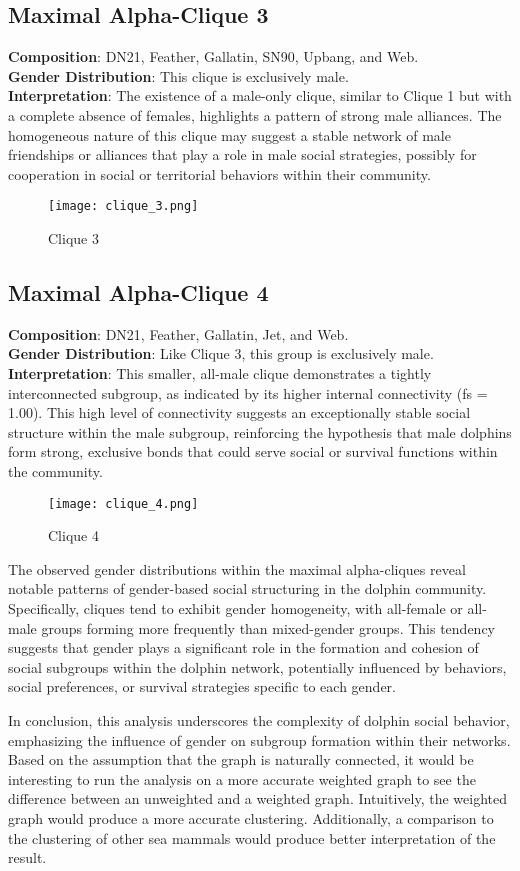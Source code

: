 \subsection{Maximal Alpha-Clique 3}
\textbf{Composition}: DN21, Feather, Gallatin, SN90, Upbang, and Web. \\
\textbf{Gender Distribution}: This clique is exclusively male. \\
\textbf{Interpretation}: The existence of a male-only clique, similar to Clique 1 but with a complete absence of females, highlights a pattern of strong male alliances. The homogeneous nature of this clique may suggest a stable network of male friendships or alliances that play a role in male social strategies, possibly for cooperation in social or territorial behaviors within their community.
\begin{figure}[H]
    \centering
    \texttt{[image: clique\_3.png]}
    \caption{Clique 3}
    \label{fig:clique_3}
\end{figure}

\subsection{Maximal Alpha-Clique 4}
\textbf{Composition}: DN21, Feather, Gallatin, Jet, and Web. \\
\textbf{Gender Distribution}: Like Clique 3, this group is exclusively male. \\
\textbf{Interpretation}: This smaller, all-male clique demonstrates a tightly interconnected subgroup, as indicated by its higher internal connectivity (fs = 1.00). This high level of connectivity suggests an exceptionally stable social structure within the male subgroup, reinforcing the hypothesis that male dolphins form strong, exclusive bonds that could serve social or survival functions within the community.
\begin{figure}[H]
    \centering
    \texttt{[image: clique\_4.png]}
    \caption{Clique 4}
    \label{fig:clique_4}
\end{figure}

The observed gender distributions within the maximal alpha-cliques reveal notable patterns of gender-based social structuring in the dolphin community. Specifically, cliques tend to exhibit gender homogeneity, with all-female or all-male groups forming more frequently than mixed-gender groups. This tendency suggests that gender plays a significant role in the formation and cohesion of social subgroups within the dolphin network, potentially influenced by behaviors, social preferences, or survival strategies specific to each gender.

In conclusion, this analysis underscores the complexity of dolphin social behavior, emphasizing the influence of gender on subgroup formation within their networks. Based on the assumption that the graph is naturally connected, it would be interesting to run the analysis on a more accurate weighted graph to see the difference between an unweighted and a weighted graph. Intuitively, the weighted graph would produce a more accurate clustering. Additionally, a comparison to the clustering of other sea mammals would produce better interpretation of the result.